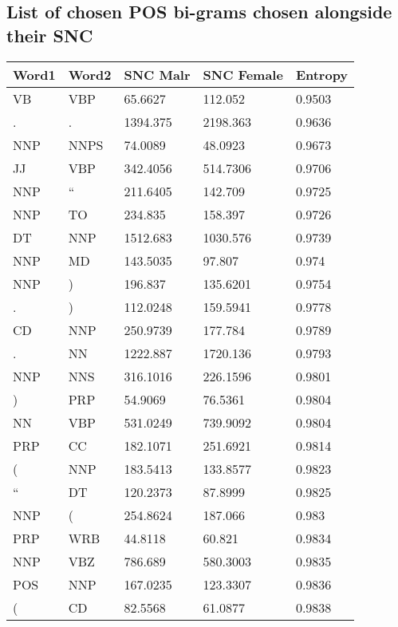 \subsection*{List of chosen POS bi-grams chosen alongside their SNC}
\begin{table}[H]
	\small
	\begin{tabular}{@{}lllll@{}}
		\toprule
		Word1 & Word2 & SNC Malr & SNC Female & Entropy \\ \midrule
		VB    & VBP   & 65.6627  & 112.052    & 0.9503  \\
		.     & .     & 1394.375 & 2198.363   & 0.9636  \\
		NNP   & NNPS  & 74.0089  & 48.0923    & 0.9673  \\
		JJ    & VBP   & 342.4056 & 514.7306   & 0.9706  \\
		NNP   & ``    & 211.6405 & 142.709    & 0.9725  \\
		NNP   & TO    & 234.835  & 158.397    & 0.9726  \\
		DT    & NNP   & 1512.683 & 1030.576   & 0.9739  \\
		NNP   & MD    & 143.5035 & 97.807     & 0.974   \\
		NNP   & )     & 196.837  & 135.6201   & 0.9754  \\
		.     & )     & 112.0248 & 159.5941   & 0.9778  \\
		CD    & NNP   & 250.9739 & 177.784    & 0.9789  \\
		.     & NN    & 1222.887 & 1720.136   & 0.9793  \\
		NNP   & NNS   & 316.1016 & 226.1596   & 0.9801  \\
		)     & PRP   & 54.9069  & 76.5361    & 0.9804  \\
		NN    & VBP   & 531.0249 & 739.9092   & 0.9804  \\
		PRP   & CC    & 182.1071 & 251.6921   & 0.9814  \\
		(     & NNP   & 183.5413 & 133.8577   & 0.9823  \\
		``    & DT    & 120.2373 & 87.8999    & 0.9825  \\
		NNP   & (     & 254.8624 & 187.066    & 0.983   \\
		PRP   & WRB   & 44.8118  & 60.821     & 0.9834  \\
		NNP   & VBZ   & 786.689  & 580.3003   & 0.9835  \\
		POS   & NNP   & 167.0235 & 123.3307   & 0.9836  \\
		(     & CD    & 82.5568  & 61.0877    & 0.9838  \\

\end{tabular}
\end{table}
